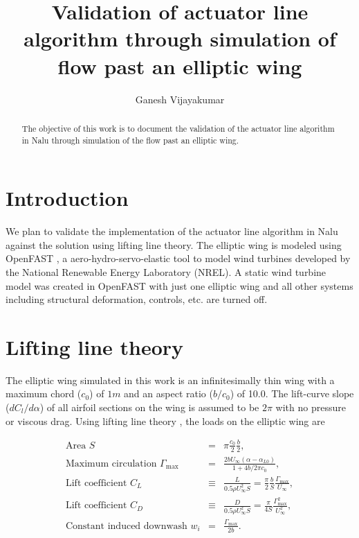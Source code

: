 \documentclass{jfm}
\title{Validation of actuator line algorithm through simulation of
  flow past an elliptic wing}
\author{Ganesh Vijayakumar}
\begin{document}
\maketitle

\begin{abstract}
The objective of this work is to document the validation of the
actuator line algorithm in Nalu through simulation of the flow past an
elliptic wing. 
\end{abstract}

\section{Introduction}
\label{sec:intro}
We plan to validate the implementation of the actuator line algorithm in Nalu
\citep{naluDoc} against the solution using lifting line theory. The
elliptic wing is modeled using OpenFAST \citep{OpenFAST:2017}, a
aero-hydro-servo-elastic tool to model wind turbines developed by the
National Renewable Energy Laboratory (NREL). A static wind turbine
model was created in OpenFAST with just one elliptic wing and all
other systems including structural deformation, controls, etc. are turned off.

\section{Lifting line theory}
\label{sec:ll_soln}

The elliptic wing simulated in this work is an infinitesimally thin wing
with a maximum chord ($c_0$) of $1m$ and an aspect ratio
($b/c_0$) of 10.0. The lift-curve slope ($d C_l/d \alpha$) of all airfoil sections on
the wing is assumed to be $2 \pi$ with no pressure or viscous drag. Using lifting line theory \citep{KatzPlotkin:2002}, the loads on the elliptic wing are

\begin{eqnarray}
\textrm{Area } S &=& \pi \frac{c_0}{2} \frac{b}{2},\\
\textrm{Maximum circulation } \Gamma_{\mathrm{max}} &=& \frac{2 b
                                                     U_{\infty}
                                                     (\alpha -
                                                     \alpha_{L0})}{1 +
                                                     4b/2\pi
                                                     c_0},\\
\textrm{Lift coefficient } C_L & \equiv & \frac{L}{0.5 \rho U_{\infty}^2
                                 S} = \frac{\pi}{2} \frac{b}{S}
                                 \frac{\Gamma_{\mathrm{max}}}{U_{\infty}},\\
\textrm{Lift coefficient } C_D & \equiv & \frac{D}{0.5 \rho U_{\infty}^2
                                 S} = \frac{\pi}{4S} \frac{\Gamma_{\mathrm{max}}^2}{U_{\infty}^2},\\
\textrm{Constant induced downwash } w_i &=&
                                          \frac{\Gamma_{\mathrm{max}}}{2b}.
\end{eqnarray}
\end{document}
